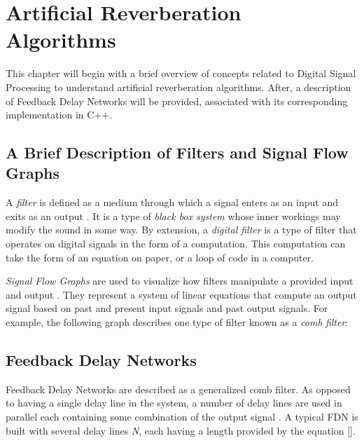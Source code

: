 \chapter{Artificial Reverberation Algorithms}
\hspace*{-0.15cm}This chapter will begin with a brief overview of concepts related to Digital Signal Processing to understand artificial reverberation algorithms. After, a description of Feedback Delay Networks will be provided, associated with its corresponding implementation in C++.

\section{A Brief Description of Filters and Signal Flow Graphs}
A \textit{filter} is defined as a medium through which a signal enters as an input and exits as an output \cite{FILTERS07}. It is a type of \textit{black box system} whose inner workings may modify the sound in some way. By extension, a \textit{digital filter} is a type of filter that operates on digital signals in the form of a computation. This computation can take the form of an equation on paper, or a loop of code in a computer.

\textit{Signal Flow Graphs} are used to visualize how filters manipulate a provided input and output \cite{FILTERS07}. They represent a system of linear equations that compute an output signal based on past and present input signals and past output signals. For example, the following graph describes one type of filter known as a \textit{comb filter}:

\section{Feedback Delay Networks}
Feedback Delay Networks are described as a generalized comb filter. As opposed to having a single delay line in the system, a number of delay lines are used in parallel each containing some combination of the output signal \cite{PUCKE}. A typical FDN is built with several delay lines \textit{N}, each having a length provided by the equation [].
